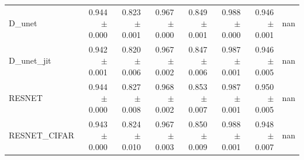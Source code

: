 \begin{table}[ht]
\begin{tabular}{lrrrrrrr}
D\_unet & 0.944 $\pm$ 0.000 & 0.823 $\pm$ 0.001 & 0.967 $\pm$ 0.000 & 0.849 $\pm$ 0.001 & 0.988 $\pm$ 0.000 & 0.946 $\pm$ 0.001 & nan \\
D\_unet\_jit & 0.942 $\pm$ 0.001 & 0.820 $\pm$ 0.006 & 0.967 $\pm$ 0.002 & 0.847 $\pm$ 0.006 & 0.987 $\pm$ 0.001 & 0.946 $\pm$ 0.005 & nan \\
RESNET & 0.944 $\pm$ 0.000 & 0.827 $\pm$ 0.008 & 0.968 $\pm$ 0.002 & 0.853 $\pm$ 0.007 & 0.987 $\pm$ 0.001 & 0.950 $\pm$ 0.005 & nan \\
RESNET\_CIFAR & 0.943 $\pm$ 0.000 & 0.824 $\pm$ 0.010 & 0.967 $\pm$ 0.003 & 0.850 $\pm$ 0.009 & 0.988 $\pm$ 0.001 & 0.948 $\pm$ 0.007 & nan \\
\hline
\end{tabular}
\end{table}

